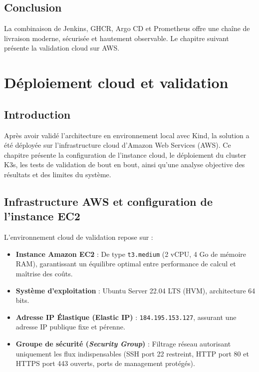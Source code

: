 \documentclass[12pt,a4paper,oneside]{report}
\begin{document}
\section{Conclusion}
La combinaison de Jenkins, GHCR, Argo CD et Prometheus offre une chaîne de livraison moderne, sécurisée et hautement observable. Le chapitre suivant présente la validation cloud sur AWS.

\clearpage

\chapter{Déploiement cloud et validation}

\section{Introduction}
Après avoir validé l'architecture en environnement local avec Kind, la solution a été déployée sur l'infrastructure cloud d'Amazon Web Services (AWS). Ce chapitre présente la configuration de l'instance cloud, le déploiement du cluster K3s, les tests de validation de bout en bout, ainsi qu'une analyse objective des résultats et des limites du système.

\section{Infrastructure AWS et configuration de l'instance EC2}
L'environnement cloud de validation repose sur :
\begin{itemize}[label=$\bullet$]
    \item \textbf{Instance Amazon EC2} : De type \texttt{t3.medium} (2 vCPU, 4 Go de mémoire RAM), garantissant un équilibre optimal entre performance de calcul et maîtrise des coûts.
    \item \textbf{Système d'exploitation} : Ubuntu Server 22.04 LTS (HVM), architecture 64 bits.
    \item \textbf{Adresse IP Élastique (Elastic IP)} : \texttt{184.195.153.127}, assurant une adresse IP publique fixe et pérenne.
    \item \textbf{Groupe de sécurité (\textit{Security Group})} : Filtrage réseau autorisant uniquement les flux indispensables (SSH port 22 restreint, HTTP port 80 et HTTPS port 443 ouverts, ports de management protégés).
\end{itemize}
\end{document}
